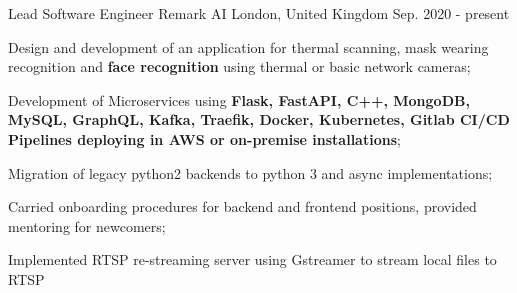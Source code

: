 

\begin{cventries}

   \cventry
    {Lead Software Engineer} %
    {Remark AI} %
    {London,  United Kingdom} %
    {Sep. 2020 - present} %
    {
      \begin{cvitems} %
        \item {Design and development of an application for thermal scanning,
        mask wearing recognition and \textbf{face recognition} using thermal or basic network cameras;}
        \item {Development of Microservices using \textbf{Flask, FastAPI, C++, MongoDB, MySQL, GraphQL, Kafka,
        Traefik, Docker, Kubernetes, Gitlab CI/CD Pipelines deploying in AWS or on-premise installations};}
        \item {Migration of legacy python2 backends to python 3 and async implementations;}
        \item {Carried onboarding procedures for backend and frontend positions, provided mentoring for newcomers;}
        \item {Implemented RTSP re-streaming server using Gstreamer to stream local files to RTSP}
      \end{cvitems}
    }


\end{cventries}
